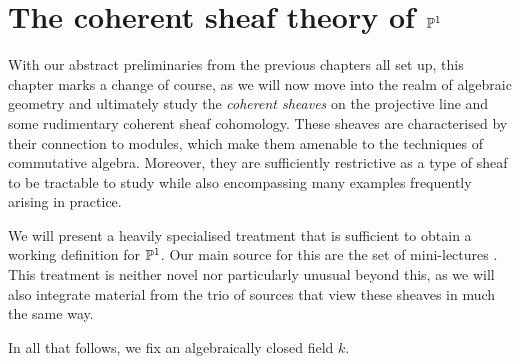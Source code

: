 \chapter{The coherent sheaf theory of $\mathbb{P}^{{1}}$}
\label{chap_coh_sheaf_theory_of_p1}

With our abstract preliminaries from the previous chapters all set
up, this chapter marks a change of course, as we will now move into
the realm of algebraic geometry and ultimately study the
\emph{coherent sheaves} on the projective line and some rudimentary
coherent sheaf cohomology.
These sheaves are characterised by their connection to modules, which
make them amenable to the techniques of commutative algebra.
Moreover, they are sufficiently restrictive as a type of sheaf to be
tractable to study while also encompassing many examples frequently
arising in practice.


We will present a heavily specialised treatment that is sufficient to
obtain a working definition for $\mathbb{P}^{{1}}$.
Our main source for this are the set of mini-lectures
\cite{users_guide_to_coh_sheaves, cohom_of_coh_sheaves}.
This treatment is neither novel nor particularly unusual beyond this,
as we will also integrate material from the trio of sources
\cite{chen_and_krause, team_edward, crawley} that view these sheaves
in much the same way.

In all that follows, we fix an algebraically closed field $k$.






